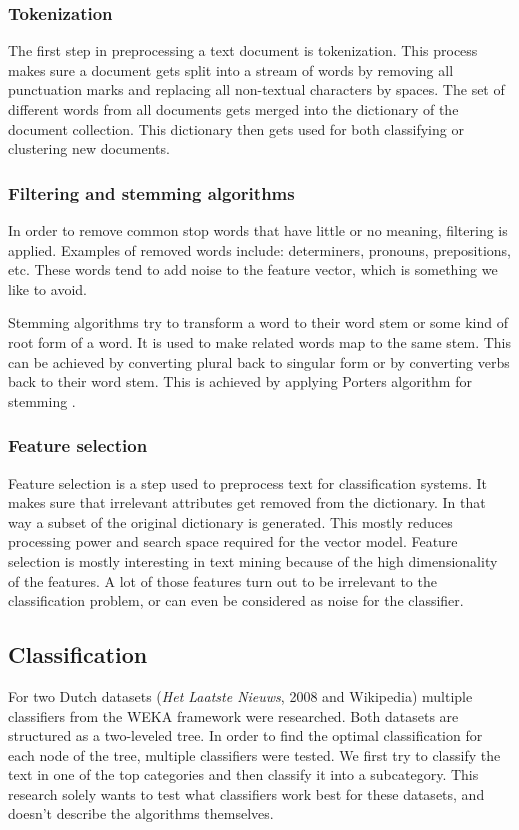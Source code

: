\documentclass[twocolumn]{phdsymp} %
\begin{document}
\subsubsection{Tokenization}
The first step in preprocessing a text document is tokenization. This process makes sure a document gets split into a stream of words by removing all punctuation marks and replacing all non-textual characters by spaces. The set of different words from all documents gets merged into the dictionary of the document collection. This dictionary then gets used for both classifying or clustering new documents.

\subsubsection{Filtering and stemming algorithms}
In order to remove common stop words that have little or no meaning, filtering is applied. Examples of removed words include: determiners, pronouns, prepositions, etc. These words tend to add noise to the feature vector, which is something we like to avoid.

Stemming algorithms try to transform a word to their word stem or some kind of root form of a word. It is used to make related words map to the same stem. This can be achieved by converting plural back to singular form or by converting verbs back to their word stem. This is achieved by applying Porters algorithm for stemming \cite{Porter1980}.  

\subsubsection{Feature selection}
Feature selection is a step used to preprocess text for classification systems. It makes sure that irrelevant attributes get removed from the dictionary. In that way a subset of the original dictionary is generated. This mostly reduces processing power and search space required for the vector model. Feature selection is mostly interesting in text mining because of the high dimensionality of the features. A lot of those features turn out to be irrelevant to the classification problem, or can even be considered as noise for the classifier.

\subsection{Classification}
For two Dutch datasets (\textit{Het Laatste Nieuws}, 2008 and Wikipedia) multiple classifiers from the WEKA framework \cite{Hall2009} were researched. Both datasets are structured as a two-leveled tree. In order to find the optimal classification for each node of the tree, multiple classifiers were tested. We first try to classify the text in one of the top categories and then classify it into a subcategory. This research solely wants to test what classifiers work best for these datasets, and doesn't describe the algorithms themselves. 
\end{document}
